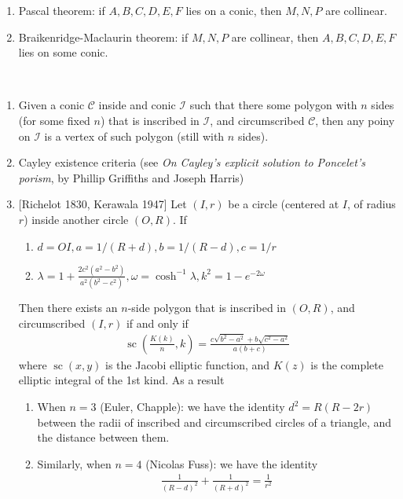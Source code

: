\documentclass{treatise}
\begin{document}
\begin{shaded}
\begin{theorem}
\begin{enumerate}
	\item Pascal theorem: if $A, B, C, D, E, F$ lies on a conic, then $M, N, P$ are collinear.
	\item Braikenridge-Maclaurin theorem: if $M, N, P$ are collinear, then $A, B, C, D, E, F$ lies on some conic.
\end{enumerate}
\end{theorem}
\begin{theorem} \ 
\begin{enumerate}
	\item Given a conic $\mathcal{C}$ inside and conic $\mathcal{I}$ such that there some polygon with $n$ sides (for some fixed $n$) that is inscribed in $\mathcal{I}$, and circumscribed $\mathcal{C}$, then any poiny on $\mathcal{I}$ is a vertex of such polygon (still with $n$ sides).
	\item Cayley existence criteria (see \textit{On Cayley's explicit solution to Poncelet's porism}, by Phillip Griffiths and Joseph Harris)
	\item {[Richelot 1830, Kerawala 1947]} Let $(I, r)$ be a circle (centered at $I$, of radius $r$) inside another circle $(O, R)$. If
	\begin{enumerate}
		\item $d = OI, a = 1/(R+d), b = 1/(R-d), c = 1/r$
		\item $\lambda = 1 + \frac{2c^2 (a^2 - b^2)}{a^2 (b^2 - c^2)}, \omega = \cosh^{-1} \lambda, k^2 = 1 - e^{-2 \omega}$
	\end{enumerate}
	Then there exists an $n$-side polygon that is inscribed in $(O, R)$, and circumscribed $(I, r)$ if and only if
	\begin{align*}
	\operatorname{sc} \left( \frac{K(k)}{n}, k \right) = \frac{c \sqrt{b^2 - a^2} + b \sqrt{c^2 - a^2}}{a(b+c)}
	\end{align*}
	where $\operatorname{sc}(x, y)$ is the Jacobi elliptic function, and $K(z)$ is the complete elliptic integral of the 1st kind. As a result
	\begin{enumerate}
		\item When $n = 3$ (Euler, Chapple): we have the identity $d^2 = R (R - 2r)$ between the radii of inscribed and circumscribed circles of a triangle, and the distance between them.
		\item Similarly, when $n = 4$ (Nicolas Fuss): we have the identity
		\begin{align*}
		\frac{1}{(R - d)^2} + \frac{1}{(R + d)^2} = \frac{1}{r^2}
		\end{align*}

\end{enumerate}
\end{enumerate}
\end{theorem}
\end{shaded}
\end{document}
